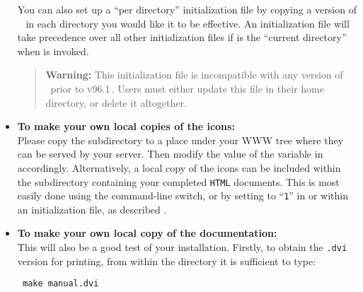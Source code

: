 \begin{itemize}
%

You can also set up a ``per directory'' initialization file by 
copying a version of \  in each directory you
would like it to be effective. An initialization file
 will take precedence over all other
initialization files if  is the ``current directory'' when
\latextohtml{} is invoked.

% 
\begin{quotation}\noindent 
\textbf{Warning: }%
This initialization file is incompatible with
any version of \latextohtml\ prior to \textsc{v96.1}\,.  
Users must either update this file in their home directory, 
or delete it altogether.
\end{quotation}

%
\item \label{icondir}%
\textbf{To make your own local copies of the \latextohtml{} icons:} \\
Please copy the  subdirectory to a 
place under your WWW tree
where they can be served by your server.
Then modify the value of the  variable in 
 accordingly.
%
Alternatively, a local copy of the icons can be included within
the subdirectory containing your completed \texttt{HTML} documents.
This is most easily done using the  command-line switch,
or by setting  to ``\texttt{1}'' in 
or within an initialization file, as described .

%
%
\item
\textbf{To make your own local copy of the \latextohtml{}
documentation:} \\
This will also be a good test of your installation. 
%
%
\noindent
Firstly, to obtain the \texttt{.dvi} version for printing,
from within the  directory it is sufficient to type:

\begin{small}
\texttt{ make manual.dvi}
\end{small}


\end{itemize}
